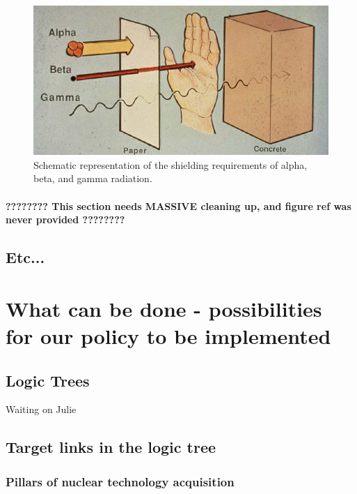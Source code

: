 \documentclass{report}
\begin{document}
\begin{figure}[h]
 \centering
 \includegraphics[trim = 0cm 0cm 0cm 0cm, clip,scale=0.5]{./figures/shielding_reqs.jpg}
   \caption{Schematic representation of the shielding requirements of alpha, beta, and gamma radiation. }
     \label{fig:shielding_reqs}
\end{figure}

\subsubsection{????????  This section needs MASSIVE cleaning up, and figure ref was never provided ????????}




\section{Etc...}




\chapter{What can be done - possibilities for our policy to be implemented}

\section{Logic Trees}

Waiting on Julie

\section{Target links in the logic tree}

\subsection{Pillars of nuclear technology acquisition }
\end{document}
